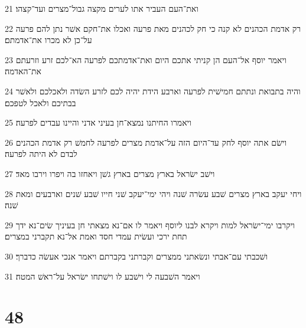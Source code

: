 \par 21 ואת־העם העביר אתו לערים מקצה גבול־מצרים ועד־קצהו׃
\par 22 רק אדמת הכהנים לא קנה כי חק לכהנים מאת פרעה ואכלו את־חקם אשׁר נתן להם פרעה על־כן לא מכרו את־אדמתם׃
\par 23 ויאמר יוסף אל־העם הן קניתי אתכם היום ואת־אדמתכם לפרעה הא־לכם זרע וזרעתם את־האדמה׃
\par 24 והיה בתבואת ונתתם חמישׁית לפרעה וארבע הידת יהיה לכם לזרע השׂדה ולאכלכם ולאשׁר בבתיכם ולאכל לטפכם׃
\par 25 ויאמרו החיתנו נמצא־חן בעיני אדני והיינו עבדים לפרעה׃
\par 26 וישׂם אתה יוסף לחק עד־היום הזה על־אדמת מצרים לפרעה לחמשׁ רק אדמת הכהנים לבדם לא היתה לפרעה׃
\par 27 וישׁב ישׂראל בארץ מצרים בארץ גשׁן ויאחזו בה ויפרו וירבו מאד׃
\par 28 ויחי יעקב בארץ מצרים שׁבע עשׂרה שׁנה ויהי ימי־יעקב שׁני חייו שׁבע שׁנים וארבעים ומאת שׁנה׃
\par 29 ויקרבו ימי־ישׂראל למות ויקרא לבנו ליוסף ויאמר לו אם־נא מצאתי חן בעיניך שׂים־נא ידך תחת ירכי ועשׂית עמדי חסד ואמת אל־נא תקברני במצרים׃
\par 30 ושׁכבתי עם־אבתי ונשׂאתני ממצרים וקברתני בקברתם ויאמר אנכי אעשׂה כדברך׃
\par 31 ויאמר השׁבעה לי וישׁבע לו וישׁתחו ישׂראל על־ראשׁ המטה׃

\chapter{48}

